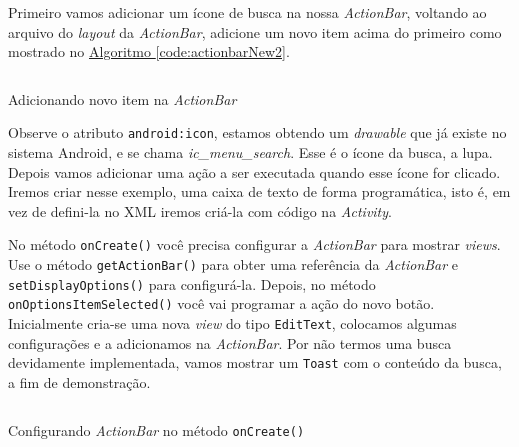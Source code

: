 \documentclass[a4paper,12pt,brazil,oneside]{book}
\begin{document}
		Primeiro vamos adicionar um ícone de busca na nossa \emph{ActionBar}, voltando ao arquivo do \emph{layout} da \emph{ActionBar}, adicione um novo item acima do primeiro como mostrado no \hyperref[code:actionbarNew2]{Algoritmo \ref*{code:actionbarNew2}}.
		
		\begin{listing}[H]
		\inputminted[linenos=true,fontsize=\small,frame=lines, framesep=2mm, tabsize=2,numbersep=5pt]{xml}{src/design/newitem.xml}
		\caption{Adicionando novo item na \emph{ActionBar}}
		\label{code:actionbarNew2}
		\end{listing}
		
		Observe o atributo \texttt{android:icon}, estamos obtendo um \emph{drawable} que já existe no sistema Android, e se chama \emph{ic\_menu\_search}. Esse é o ícone da busca, a lupa. Depois vamos adicionar uma ação a ser executada quando esse ícone for clicado. Iremos criar nesse exemplo, uma caixa de texto de forma programática, isto é, em vez de defini-la no XML iremos criá-la com código na \emph{Activity}. 
		
		No método \texttt{onCreate()} você precisa configurar a \emph{ActionBar} para mostrar \emph{views}. Use o método \texttt{getActionBar()} para obter uma referência da \emph{ActionBar} e \texttt{setDisplayOptions()} para configurá-la. Depois, no método \texttt{onOptionsItemSelected()} você vai programar a ação do novo botão. Inicialmente cria-se uma nova \emph{view} do tipo \texttt{EditText}, colocamos algumas configurações e a adicionamos na \emph{ActionBar}. Por não termos uma busca devidamente implementada, vamos mostrar um \texttt{Toast} com o conteúdo da busca, a fim de demonstração.
		
		\begin{listing}[H]
		\inputminted[linenos=true,fontsize=\small,frame=lines, framesep=2mm, tabsize=2,numbersep=5pt]{java}{src/design/actionbar-oncreate.java}
		\caption{Configurando \emph{ActionBar} no método \texttt{onCreate()}}
		\end{listing}
		
\end{document}
